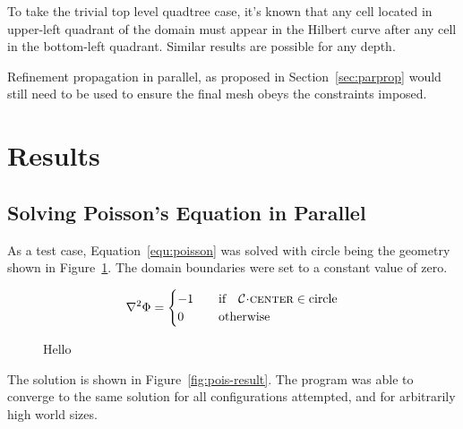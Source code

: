 \documentclass[twoside]{IIBproject}
\newcommand{\acc}{{\mkern 0.5mu\cdot\mkern 0.5mu}}
\numberwithin{figure}{section}
\begin{document}
            To take the trivial top level quadtree case, it's known that any cell located in upper-left quadrant of the domain must appear in the Hilbert curve after any cell in the bottom-left quadrant. Similar results are possible for any depth. 

            Refinement propagation in parallel, as proposed in Section~\ref{sec:parprop} would still need to be used to ensure the final mesh obeys the constraints imposed. 
 




\section{Results} %
    \label{sec:results}

    \subsection{Solving Poisson's Equation in Parallel} %
        \label{sec:results-poissons}

        As a test case, Equation~\ref{equ:poisson} was solved with circle being the geometry shown in Figure~\ref{fig:pois-geometry}. The domain boundaries were set to a constant value of zero.

        \begin{equation}
            \laplacian{\Phi}=\begin{cases}
                -1 & \qq{if} \mathcal{C}\acc\textproc{center} \in \text{circle} \\
                0 & \qq{otherwise}
            \end{cases}
            \label{equ:poisson}
        \end{equation}

        \begin{figure}[!htbp]
            \centering
            \caption{Hello}
            \label{fig:pois-geometry}
        \end{figure}

        The solution is shown in Figure~\ref{fig:pois-result}. The program was able to converge to the same solution for all configurations attempted, and for arbitrarily high world sizes. 
\end{document}
